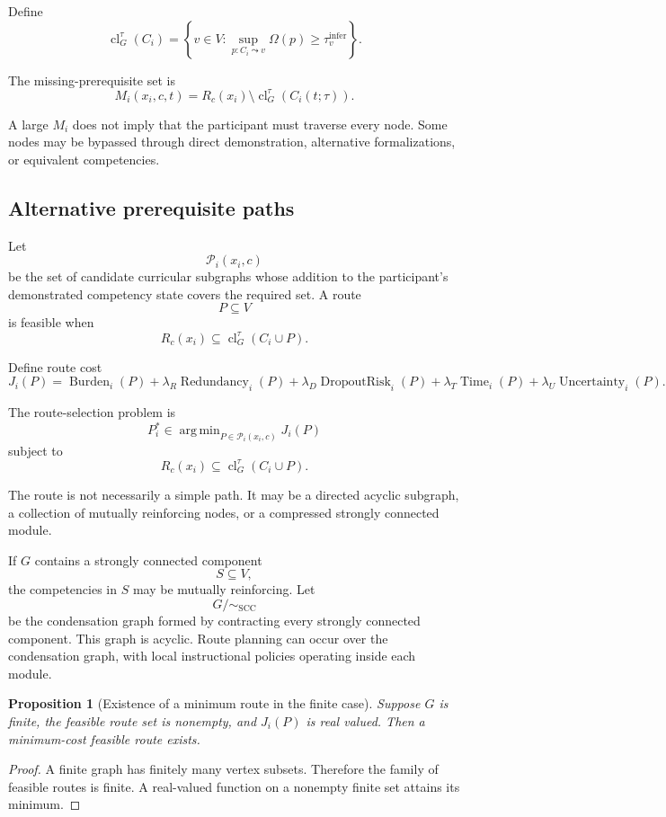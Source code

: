 \documentclass[11pt]{article}
\newtheorem{proposition}[definition]{Proposition}
\theoremstyle{definition}
\DeclareMathOperator{\argmin}{arg\,min}
\DeclareMathOperator{\closure}{cl}
\begin{document}
Define
\[
\closure_G^\tau(C_i)
=
\left\{
v\in V:
\sup_{p:C_i\leadsto v}
\Omega(p)\geq\tau_v^{\mathrm{infer}}
\right\}.
\]

The missing-prerequisite set is
\[
M_i(x_i,c,t)
=
R_c(x_i)
\setminus
\closure_G^\tau(C_i(t;\tau)).
\]

A large \(M_i\) does not imply that the participant must traverse every node. Some nodes may be bypassed through direct demonstration, alternative formalizations, or equivalent competencies.

\subsection{Alternative prerequisite paths}

Let
\[
\mathcal P_i(x_i,c)
\]
be the set of candidate curricular subgraphs whose addition to the participant's demonstrated competency state covers the required set. A route
\[
P\subseteq V
\]
is feasible when
\[
R_c(x_i)
\subseteq
\closure_G^\tau(C_i\cup P).
\]

Define route cost
\[
J_i(P)
=
\operatorname{Burden}_i(P)
+
\lambda_R\operatorname{Redundancy}_i(P)
+
\lambda_D\operatorname{DropoutRisk}_i(P)
+
\lambda_T\operatorname{Time}_i(P)
+
\lambda_U\operatorname{Uncertainty}_i(P).
\]

The route-selection problem is
\[
P_i^{*}
\in
\argmin_{P\in\mathcal P_i(x_i,c)}
J_i(P)
\]
subject to
\[
R_c(x_i)
\subseteq
\closure_G^\tau(C_i\cup P).
\]

The route is not necessarily a simple path. It may be a directed acyclic subgraph, a collection of mutually reinforcing nodes, or a compressed strongly connected module.

If \(G\) contains a strongly connected component
\[
S\subseteq V,
\]
the competencies in \(S\) may be mutually reinforcing. Let
\[
G/{\sim_{\mathrm{SCC}}}
\]
be the condensation graph formed by contracting every strongly connected component. This graph is acyclic. Route planning can occur over the condensation graph, with local instructional policies operating inside each module.

\begin{proposition}[Existence of a minimum route in the finite case]
Suppose \(G\) is finite, the feasible route set is nonempty, and \(J_i(P)\) is real valued. Then a minimum-cost feasible route exists.
\end{proposition}

\begin{proof}
A finite graph has finitely many vertex subsets. Therefore the family of feasible routes is finite. A real-valued function on a nonempty finite set attains its minimum.
\end{proof}
\end{document}
